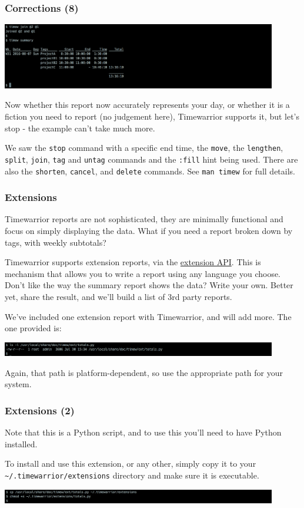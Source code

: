 \documentclass[t,handout]{beamer}
\begin{document}
\begin{frame}[fragile]\frametitle{Corrections (8)}
    \vfill
    \includegraphics[width=12cm]{images/tutorial43.png}

    Now whether this report now accurately represents your day, or whether it is a fiction you need to report (no judgement here), Timewarrior supports it, but let's stop - the example can't take much more.

    We saw the \verb=stop= command with a specific end time, the \verb=move=, the \verb=lengthen=, \verb=split=, \verb=join=, \verb=tag= and \verb=untag= commands and the \verb=:fill= hint being used. There are also the \verb=shorten=, \verb=cancel=, and \verb=delete= commands.  See \verb=man timew= for full details.
\end{frame}

\begin{frame}[fragile]\frametitle{Extensions}
    \vfill
    Timewarrior reports are not sophisticated, they are minimally functional and focus on simply displaying the data. What if you need a report broken down by tags, with weekly subtotals?

    Timewarrior supports extension reports, via the \href{https://taskwarrior.orgdocs/timewarrior/api.html}{extension API}. This is mechanism that allows you to write a report using any language you choose. Don't like the way the summary report shows the data? Write your own. Better yet, share the result, and we'll build a list of 3rd party reports.

    We've included one extension report with Timewarrior, and will add more. The one provided is:

    \includegraphics[width=12cm]{images/tutorial44.png}

    Again, that path is platform-dependent, so use the appropriate path for your system.
\end{frame}

\begin{frame}[fragile]\frametitle{Extensions (2)}
    \vfill
    Note that this is a Python script, and to use this you'll need to have Python installed.

    To install and use this extension, or any other, simply copy it to your \verb=~/.timewarrior/extensions= directory and make sure it is executable.

    \includegraphics[width=12cm]{images/tutorial45.png}
\end{frame}
\end{document}
